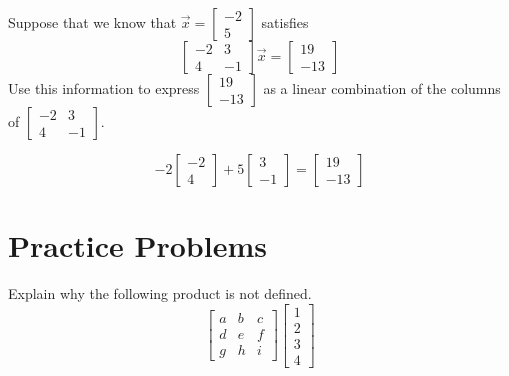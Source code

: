 \documentclass{ximera}
\begin{document}
\begin{example}\label{ex:linearcombofcols1}
Suppose that we know that $\vec{x}=\begin{bmatrix} -2\\5\end{bmatrix}$ satisfies
$$\begin{bmatrix}
-2&3\\
4&-1
\end{bmatrix}\vec{x}=\begin{bmatrix} 19\\-13\end{bmatrix}$$
Use this information to express $\begin{bmatrix} 19\\-13\end{bmatrix}$ as a linear combination of the columns of $\begin{bmatrix}
-2&3\\
4&-1
\end{bmatrix}$.
\begin{explanation}
$$-2\begin{bmatrix} -2\\4\end{bmatrix}+5\begin{bmatrix} 3\\-1\end{bmatrix}=\begin{bmatrix} 19\\-13\end{bmatrix}$$
\end{explanation}

\end{example}






\section*{Practice Problems}

\begin{problem} Explain why the following product is not defined.
$$\begin{bmatrix}a&b&c\\d&e&f\\g&h&i\end{bmatrix}\begin{bmatrix}1\\2\\3\\4\end{bmatrix}$$
\end{problem}
\end{document}
